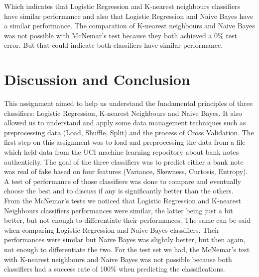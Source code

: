 \documentclass[a4paper]{article}
\begin{document}
Which indicates that Logistic Regression and K-nearest neighbours classifiers have similar performance and
also that Logistic Regression and Naive Bayes have a similar performance.
The comparation of K-nearest neighbours and Naive Bayes was not possible with McNemar's test because
they both achieved a 0\% test error. But that could indicate both classifiers have similar performance.

\section{Discussion and Conclusion}
This assignment aimed to help us understand the fundamental principles of three 
classifiers: Logistic Regression, K-nearest Neighbours and Naive Bayes. 
It also allowed us to understand and apply some data management techniques 
such as preprocessing data (Load, Shuffle, Split) and the process of Cross Validation. 
The first step on this assignment was to load and preprocessing the data from a 
file which held data from the UCI machine learning repository about bank notes 
authenticity. The goal of the three classifiers was to predict either a bank note 
was real of fake based on four features (Variance, Skewness, Curtosis, Entropy).
A test of performance of those classifiers was done to compare and eventually 
choose the best and to discuss if any is significantly better than the others.\\
From the McNemar's tests we noticed that Logistic Regression and K-nearest 
Neighbours classifiers performances were similar, the latter being just 
a bit better, but not enough to differentiate their performances. 
The same can be said when comparing Logistic Regression and Naive Bayes classifiers.
Their performances were similar but Naive Bayes was slightly better,
but then again, not enough to differentiate the two.
For the test set we had, the McNemar's test with K-nearest neighbours and Naive Bayes was
not possible because both classifiers had a success rate of 100\% when predicting the classifications. 
  
\clearpage
\end{document}
